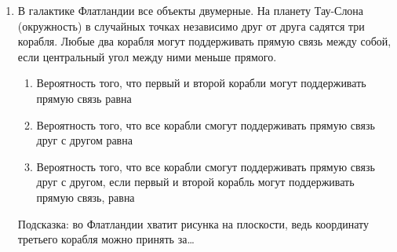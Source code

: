 \documentclass[12pt, a4paper]{article}\usepackage[]{graphicx}\usepackage[]{color}
\begin{document}
\begin{enumerate}

					\item В галактике Флатландии все объекты двумерные. На планету Тау-Слона (окружность) в случайных точках независимо друг от друга садятся три корабля. Любые два корабля могут поддерживать прямую связь между собой, если центральный угол между ними меньше прямого.

					\begin{enumerate}
						\item Вероятность того, что первый и второй корабли могут поддерживать прямую связь равна \underline{\hspace{2cm}}
						\item Вероятность того, что все корабли смогут поддерживать прямую связь друг с другом равна \underline{\hspace{2cm}}
						\item Вероятность того, что все корабли смогут поддерживать прямую связь друг с другом, если первый и второй корабль могут поддерживать прямую связь, равна \underline{\hspace{2cm}}
					\end{enumerate}
					Подсказка: во Флатландии хватит рисунка на плоскости, ведь координату третьего корабля можно принять за\ldots




\end{enumerate}
\end{document}
